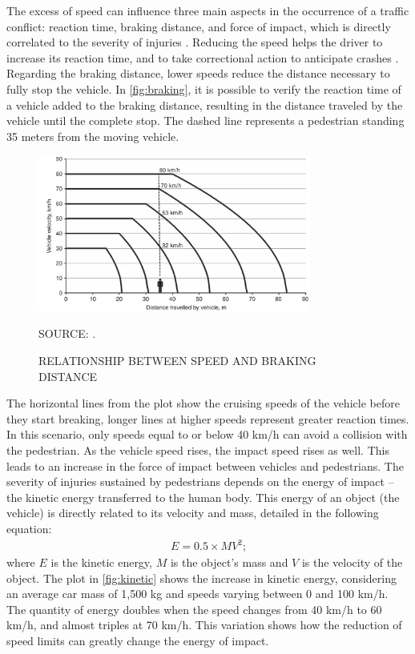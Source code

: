 The excess of speed can influence three main aspects in the occurrence of a traffic conflict: reaction time, braking distance, and force of impact, which is directly correlated to the severity of injuries \cite{Mohan2016a}. Reducing the speed helps the driver to increase its reaction time, and to take correctional action to anticipate crashes \cite{Elvik2009}. Regarding the braking distance, lower speeds reduce the distance necessary to fully stop the vehicle. In \autoref{fig:braking}, it is possible to verify the reaction time of a vehicle added to the braking distance, resulting in the distance traveled by the vehicle until the complete stop. The dashed line represents a pedestrian standing 35 meters from the moving vehicle. 

\begin{figure}[!htbp]
    \centering\footnotesize
    \captionsetup{font=footnotesize}
    \caption{RELATIONSHIP BETWEEN SPEED AND BRAKING DISTANCE}
    \includegraphics[width=0.8\textwidth]{fig/braking2.png}
    \label{fig:braking}
    \par SOURCE: \textcite{Mohan2016a}.
\end{figure} 

The horizontal lines from the plot show the cruising speeds of the vehicle before they start breaking, longer lines at higher speeds represent greater reaction times. In this scenario, only speeds equal to or below 40 km/h can avoid a collision with the pedestrian. As the vehicle speed rises, the impact speed rises as well. This leads to  an increase in the force of impact between vehicles and pedestrians. The severity of injuries sustained by pedestrians depends on the energy of impact – the kinetic energy transferred to the human body. This energy of an object (the vehicle) is directly related to its velocity and mass, detailed in the following equation: \begin{align}
    E = 0.5 \times MV^2 \mbox{;}
    \label{eq:energy}
\end{align} where $E$ is the kinetic energy, $M$ is the object's mass and $V$ is the velocity of the object. The plot in \autoref{fig:kinetic} shows the increase in kinetic energy, considering an average car mass of 1,500 kg \cite{Zervas2008} and speeds varying between 0 and 100 km/h. The quantity of energy doubles when the speed changes from 40 km/h to 60 km/h, and almost triples at 70 km/h. This variation shows how the reduction of speed limits can greatly change the energy of impact.

